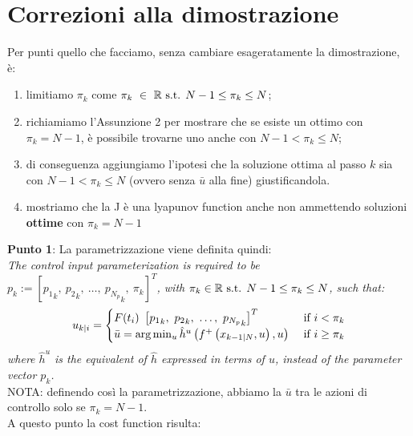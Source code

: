\documentclass[12pt]{article}
\begin{document}
\section*{Correzioni alla dimostrazione}

Per punti quello che facciamo, senza cambiare esageratamente la dimostrazione, è:
\begin{enumerate}
\item limitiamo $\pi_k$ come  $\pi_k\ \in\  \mathbb{R} \textnormal{ s.t. } N-1 \leq \pi_k \leq N$;
\item richiamiamo l'Assunzione 2 per mostrare che se esiste un ottimo con $\pi_k = N-1$, è possibile trovarne uno anche con $N-1 < \pi_k \leq N$;
\item di conseguenza aggiungiamo l'ipotesi che la soluzione ottima al passo $k$ sia con $N-1 < \pi_k \leq N$ (ovvero senza $\bar{u}$ alla fine) giustificandola.
\item mostriamo che la J è una lyapunov function anche non ammettendo soluzioni \textbf{ottime} con $\pi_k = N-1$
\end{enumerate}

\textbf{Punto 1}:
La parametrizzazione viene definita quindi: \\

\textit{The control input parameterization is required to be $p_k:=[{p_1}_k,\ {p_2}_k,\ \dots,\ {p_{N_p}}_k,\ \pi_k]^T$, with $\pi_k \in \mathbb{R} \textnormal{ s.t. } N-1 \leq \pi_k \leq N$, such that: 
\begin{equation*}
\begin{split}
    u_{k|i}=
        \begin{cases}
            F(t_i)\ \left[{p_1}_k,\ {p_2}_k,\ \dots,\ {p_{N_p}}_k\right]^T &\textnormal{if } i<\pi_k \\
            \Bar{u}=\arg\min_u \hat{h}^u\left({f}^+\left(x_{k-1|N},u\right),u\right)  \ &\textnormal{if } i\ge \pi_k
        \end{cases}
    \end{split}
\end{equation*}
where $\hat{h}^u$ is the equivalent of $\hat{h}$ expressed in terms of $u$, instead of the parameter vector $p_k$.} \\

NOTA: definendo così la parametrizzazione, abbiamo la $\bar{u}$ tra le azioni di controllo solo se $\pi_k = N-1 $. \\ 
A questo punto la cost function risulta: 
\end{document}
